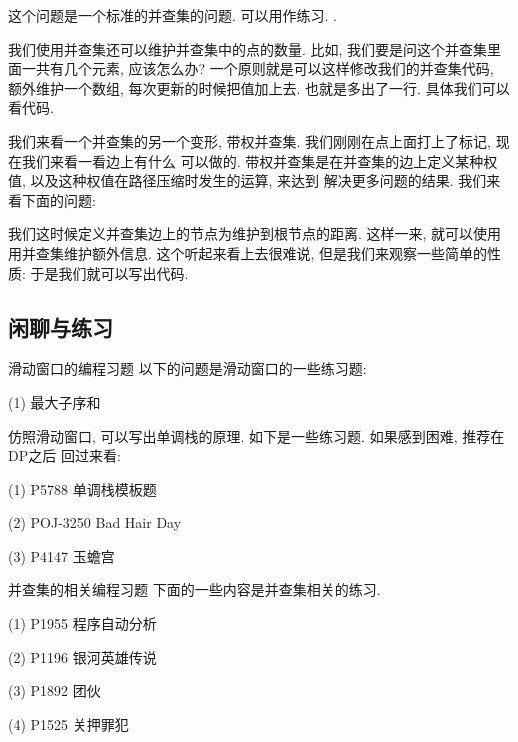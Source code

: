  这个问题是一个标准的并查集的问题. 可以用作练习. . 

我们使用并查集还可以维护并查集中的点的数量. 比如, 我们要是问这个并查集里面一共有几个元素, 应该怎么办?
一个原则就是可以这样修改我们的并查集代码, 额外维护一个数组, 每次更新的时候把值加上去. 
也就是多出了一行. 具体我们可以看代码.

我们来看一个并查集的另一个变形, 带权并查集. 我们刚刚在点上面打上了标记, 现在我们来看一看边上有什么
可以做的. 带权并查集是在并查集的边上定义某种权值, 以及这种权值在路径压缩时发生的运算, 来达到
解决更多问题的结果. 我们来看下面的问题: 

 我们这时候定义并查集边上的节点为维护到根节点的距离. 这样一来, 就可以使用
用并查集维护额外信息. 这个听起来看上去很难说, 但是我们来观察一些简单的性质: 
于是我们就可以写出代码.

\subsection*{闲聊与练习}

\begin{exercise}{滑动窗口的编程习题}
    以下的问题是滑动窗口的一些练习题: 

    (1) 最大子序和

    仿照滑动窗口, 可以写出单调栈的原理. 如下是一些练习题. 如果感到困难, 推荐在DP之后
    回过来看: 

    (1) P5788 单调栈模板题

    (2) POJ-3250 Bad Hair Day 

    (3) P4147 玉蟾宫
\end{exercise}

\begin{exercise}{并查集的相关编程习题}
    下面的一些内容是并查集相关的练习. 

    (1) P1955 程序自动分析

    (2) P1196 银河英雄传说

    (3) P1892 团伙

    (4) P1525 关押罪犯

\end{exercise}